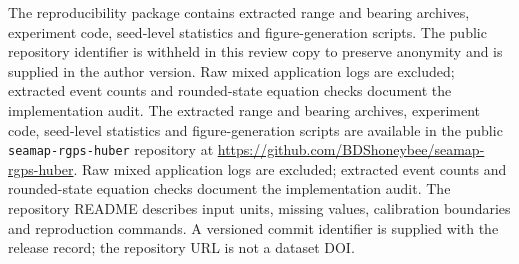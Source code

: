 \ifdefined\BlindReview
The reproducibility package contains extracted range and bearing archives, experiment code, seed-level statistics and figure-generation scripts. The public repository identifier is withheld in this review copy to preserve anonymity and is supplied in the author version. Raw mixed application logs are excluded; extracted event counts and rounded-state equation checks document the implementation audit.
\else
The extracted range and bearing archives, experiment code, seed-level statistics and figure-generation scripts are available in the public \texttt{seamap-rgps-huber} repository at \url{https://github.com/BDShoneybee/seamap-rgps-huber}. Raw mixed application logs are excluded; extracted event counts and rounded-state equation checks document the implementation audit. The repository README describes input units, missing values, calibration boundaries and reproduction commands. A versioned commit identifier is supplied with the release record; the repository URL is not a dataset DOI.
\fi
